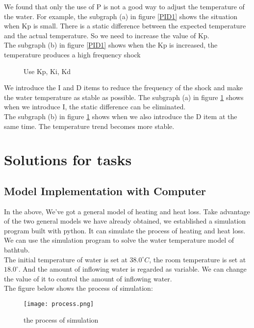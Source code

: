 \documentclass{mcmthesis}
\begin{document}
\indent We found that only the use of P is not a good way to adjust the temperature of the water. For example, the subgraph (a) in figure \ref{PID1} shows the situation when Kp is small. There is a static difference between the expected temperature and the actual temperature. So we need to increase the value of Kp.\\
\indent The subgraph (b) in figure \ref{PID1} shows when the Kp is increased, the temperature produces a high frequency shock\\

\begin{figure}[H]
\centering
{}
\caption{Use Kp, Ki, Kd}
\label{PID2}
\end{figure}
\indent We introduce the I and D items to reduce the frequency of the shock and make the water temperature as stable as possible. The subgraph (a) in figure \ref{PID2} shows when we introduce I, the static difference can be eliminated. \\
\indent The subgraph (b) in figure \ref{PID2} shows when we also introduce the D item at the same time. The temperature trend becomes more stable.\\
\section{Solutions for tasks}
\subsection{Model Implementation with Computer}
\indent In the above, We've got a general model of heating and heat loss. Take advantage of the two general models we have already obtained, we established a simulation program built with python. It can simulate the process of heating and heat loss. We can use the simulation program to solve the water temperature model of bathtub.\\
\indent The initial temperature of water is set at $38.0^{\circ}C$, the room temperature is set at $18.0^{\circ}$. And the amount of inflowing water is regarded as variable. We can change the value of it to control the amount of inflowing water.\\
\indent The figure below shows the process of simulation:
 \begin{figure}[H]
\centerline{\texttt{[image: process.png]}}
\caption{the process of simulation}                  %
\label{oval}	
\end{figure}
\end{document}
